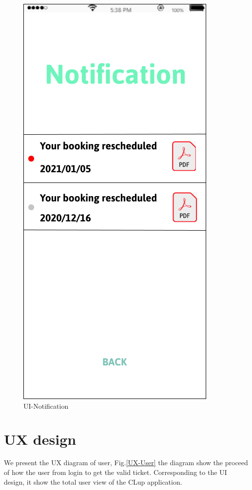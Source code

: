 \documentclass[a4paper,12pt]{report}
\begin{document}
\begin{figure}[H]
	\centering
	\includegraphics[scale=0.6]{UI-Notification.png}
	\caption{UI-Notification}
	\centering
	\label{UI-Notification}
\end{figure}

\section{UX design}
We present the UX diagram of user, Fig.\ref{UX-User} the diagram show the proceed of how the user from login to get the valid ticket. Corresponding to the UI design, it show the total user view of the CLup application.~\\
\end{document}
